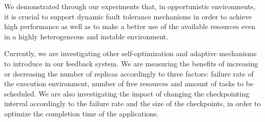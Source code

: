 \documentclass[times, 09pt, twocolumn]{article}
\begin{document}
We demonstrated through our experiments that, in opportunistic environments,
it is crucial to support dynamic fault tolerance mechanisms in order to
achieve high performance as well as to make a better use of the available
resources even in a highly heterogeneous and instable environment.

Currently, we are investigating other self-optimization and adaptive mechanisms
to introduce in our feedback system. We are measuring the benefits of increasing
or decreasing the number of replicas accordingly to three factors: failure rate
of the execution environment, number of free resources and amount of tasks to
be scheduled. We are also investigating the impact of changing the
checkpointing interval accordingly to the failure rate and the size of the
checkpoints, in order to optimize the completion time of the applications. 



\end{document}
